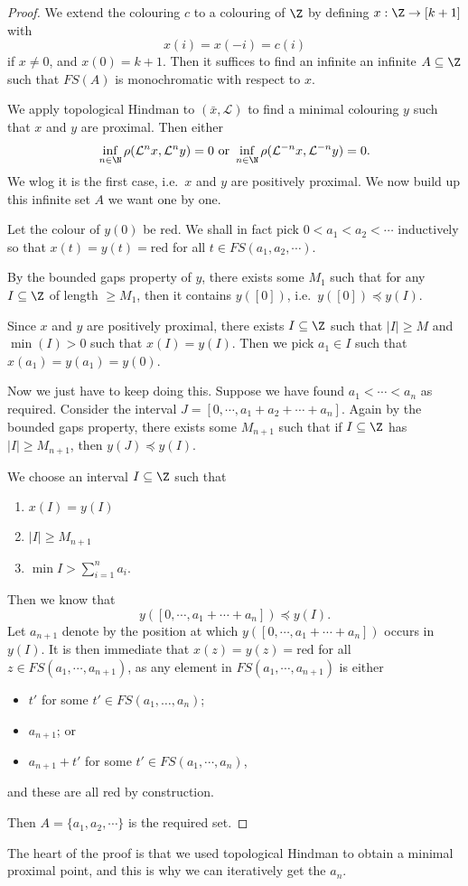 \documentclass[a4paper]{article}
\begin{document}
\begin{proof}
  We extend the colouring $c$ to a colouring of $\Z$ by defining $x: \Z \to [k + 1]$ with
  \[
    x(i) = x(-i) = c(i)
  \]
  if $x\not= 0$, and $x(0) = k + 1$. Then it suffices to find an infinite an infinite $A \subseteq \Z$ such that $FS(A)$ is monochromatic with respect to $x$.

  We apply topological Hindman to $(\bar{x}, \mathcal{L})$ to find a minimal colouring $y$ such that $x$ and $y$ are proximal. Then either
  \[
    \inf_{n \in \N} \rho(\mathcal{L}^n x, \mathcal{L}^n y) = 0\text{ or } \inf_{n \in \N} \rho(\mathcal{L}^{-n} x, \mathcal{L}^{-n} y) = 0.
  \]
  We wlog it is the first case, i.e.\ $x$ and $y$ are positively proximal. We now build up this infinite set $A$ we want one by one.

  Let the colour of $y(0)$ be red. We shall in fact pick $0 < a_1 < a_2 < \cdots$ inductively so that $x(t) = y(t) = \text{red}$ for all $t \in FS(a_1, a_2, \cdots)$.

  By the bounded gaps property of $y$, there exists some $M_1$ such that for any $I \subseteq \Z$ of length $\geq M_1$, then it contains $y([0])$, i.e.\ $y([0]) \preccurlyeq y(I)$.

  Since $x$ and $y$ are positively proximal, there exists $I \subseteq \Z$ such that $|I| \geq M$ and $\min(I) > 0$ such that $x(I) = y(I)$. Then we pick $a_1 \in I$ such that $x(a_1) = y(a_1) = y(0)$.

  Now we just have to keep doing this. Suppose we have found $a_1 < \cdots < a_n$ as required. Consider the interval $J = [0, \cdots, a_1 + a_2 + \cdots + a_n]$. Again by the bounded gaps property, there exists some $M_{n + 1}$ such that if $I \subseteq \Z$ has $|I| \geq M_{n + 1}$, then $y(J) \preccurlyeq y(I)$.

  We choose an interval $I \subseteq \Z$ such that
  \begin{enumerate}
    \item $x(I) = y(I)$
    \item $|I| \geq M_{n + 1}$
    \item $\min I > \sum_{i = 1}^n a_i$.
  \end{enumerate}
  Then we know that
  \[
    y([0, \cdots, a_1 + \cdots + a_n]) \preccurlyeq y(I).
  \]
  Let $a_{n + 1}$ denote by the position at which $y([0, \cdots, a_1 + \cdots + a_n])$ occurs in $y(I)$. It is then immediate that $x(z) = y(z) = \mathrm{red}$ for all $z \in FS(a_1, \cdots, a_{n + 1})$, as any element in $FS(a_1, \cdots, a_{n + 1})$ is either
  \begin{itemize}
    \item $t'$ for some $t' \in FS(a_1, \ldots, a_n)$;
    \item $a_{n + 1}$; or
    \item $a_{n + 1} + t'$ for some $t' \in FS(a_1, \cdots, a_n)$,
  \end{itemize}
  and these are all red by construction.

  Then $A = \{a_1, a_2, \cdots\}$ is the required set.
\end{proof}
The heart of the proof is that we used topological Hindman to obtain a minimal proximal point, and this is why we can iteratively get the $a_n$.
\end{document}
